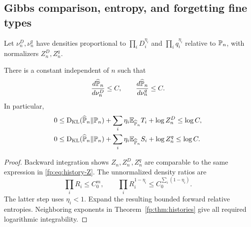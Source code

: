 \subsection{Gibbs comparison, entropy, and forgetting fine types}
Let $\nu_n^D,\nu_n^q$ have densities proportional to $\prod_iD_i^{\eta_i}$ and $\prod_iq_i^{\eta_i}$ relative to $\mathbb P_n$, with normalizers $Z_n^D,Z_n^q$.
\begin{corollary}\label{fp:cor:history-gibbs}
There is a constant independent of $n$ such that
\[
 \frac{d\widehat{\mathbb P}_n}{d\nu_n^D}\le C,
 \qquad\frac{d\widehat{\mathbb P}_n}{d\nu_n^q}\le C.
\]
In particular,
\begin{align}
 0&\le\operatorname{D_{\mathrm{KL}}}(\widehat{\mathbb P}_n\Vert\mathbb P_n)+\sum_i\eta_i\mathbb E_{\widehat{\mathbb P}_n}T_i+\log Z_n^D\le\log C,\label{fp:eq:history-gibbsD}\\
 0&\le\operatorname{D_{\mathrm{KL}}}(\widehat{\mathbb P}_n\Vert\mathbb P_n)+\sum_i\eta_i\mathbb E_{\widehat{\mathbb P}_n}S_i+\log Z_n^q\le\log C.\label{fp:eq:history-gibbsQ}
\end{align}
\end{corollary}
\begin{proof}
Backward integration shows $Z_n,Z_n^D,Z_n^q$ are comparable to the same expression in \eqref{fp:eq:history-Z}. The unnormalized density ratios are
\[
 \prod_iR_i\le C_0^m,
 \qquad
 \prod_iR_i^{1-\eta_i}\le C_0^{\sum_i(1-\eta_i)}.
\]
The latter step uses $\eta_i<1$. Expand the resulting bounded forward relative entropies. Neighboring exponents in Theorem~\ref{fp:thm:histories} give all required logarithmic integrability.
\end{proof}

